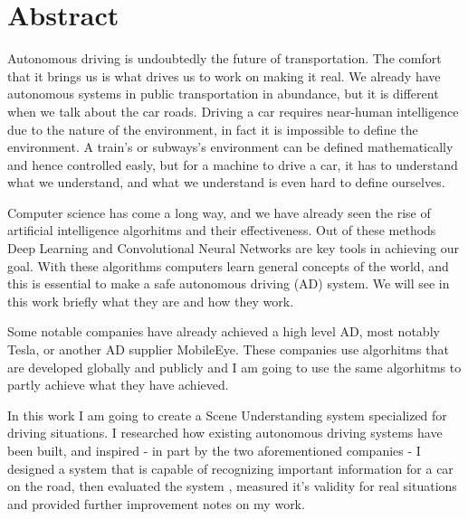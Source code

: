 \setcounter{page}{1}

\selectenglish


\chapter*{Abstract}

Autonomous driving is undoubtedly the future of transportation. The comfort that it brings us is what drives us to work on making it real. We already have autonomous
systems in public transportation in abundance, but it is different when we talk about the car roads. Driving a car requires near-human intelligence
due to the nature of the environment, in fact it is impossible to define the environment. A train's or subways's environment can be defined mathematically and hence controlled
easly, but for a machine to drive a car, it has to understand what we understand, and what we understand is even hard to define ourselves.

Computer science has come a long way, and we have already seen the rise of artificial intelligence algorhitms and their effectiveness. Out of these methods Deep Learning and 
Convolutional Neural Networks are key tools in achieving our goal. With these algorithms computers learn general concepts of the world, and this is essential to make a
safe autonomous driving (AD) system. We will see in this work briefly what they are and how they work. 

Some notable companies have already achieved a high level AD, most notably Tesla, or another AD supplier MobileEye. These companies use algorhitms that are 
developed globally and publicly and I am going to use the same algorhitms to partly achieve what they have achieved. 

In this work I am going to create a Scene Understanding system specialized for driving situations. I researched how existing autonomous driving systems have been built, and
inspired - in part by the two aforementioned companies - I designed a system that is capable of recognizing important information for a car on the road, then evaluated the system
, measured it's validity for real situations and provided further improvement notes on my work.

\vfill
\selectthesislanguage

\setcounter{romanPage}{\value{page}}
